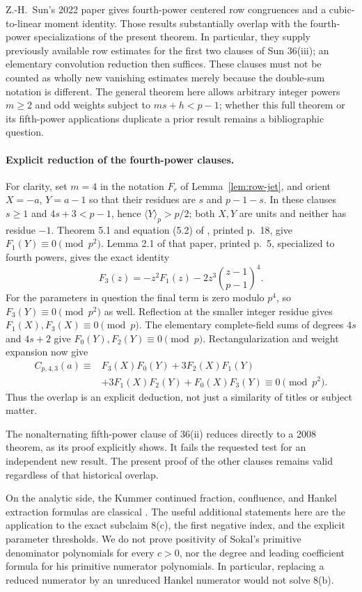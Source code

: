\documentclass[11pt,a4paper]{article}
\theoremstyle{remark}
\begin{document}
Z.-H.~Sun's 2022 paper \cite{zhsun2022} gives fourth-power centered
row congruences and a cubic-to-linear moment identity. Those results
substantially overlap with the fourth-power specializations of the
present theorem. In particular, they supply previously available row
estimates for the first two clauses of Sun 36(iii); an elementary
convolution reduction then suffices. These clauses must not be counted
as wholly new vanishing estimates merely because the double-sum
notation is different. The general theorem here allows arbitrary
integer powers $m\ge2$ and odd weights subject to $ms+h<p-1$;
whether this full theorem or its fifth-power applications duplicate a
prior result remains a bibliographic question.

\paragraph{Explicit reduction of the fourth-power clauses.}
For clarity, set $m=4$ in the notation $F_r$ of
Lemma~\ref{lem:row-jet}, and orient $X=-a$, $Y=a-1$ so that their
residues are $s$ and $p-1-s$. In these clauses $s\ge1$ and
$4s+3<p-1$, hence $\langle Y\rangle_p>p/2$; both $X,Y$ are units
and neither has residue $-1$. Theorem 5.1 and equation (5.2) of
\cite{zhsun2022}, printed p.~18, give
$F_1(Y)\equiv0\pmod{p^2}$. Lemma 2.1 of that paper, printed p.~5,
specialized to fourth powers, gives the exact identity
\[
 F_3(z)=-z^2F_1(z)-2z^3\binom{z-1}{p-1}^{4}.
\]
For the parameters in question the final term is zero modulo $p^4$,
so $F_3(Y)\equiv0\pmod{p^2}$ as well. Reflection at the smaller
integer residue gives $F_1(X),F_3(X)\equiv0\pmod p$.
The elementary complete-field sums of degrees $4s$ and $4s+2$ give
$F_0(Y),F_2(Y)\equiv0\pmod p$.
Rectangularization and weight expansion now give
\begin{align*}
 C_{p,4,3}(a)\equiv{}&F_3(X)F_0(Y)+3F_2(X)F_1(Y)\\
 &+3F_1(X)F_2(Y)+F_0(X)F_3(Y)\equiv0\pmod{p^2}.
\end{align*}
Thus the overlap is an explicit deduction, not just a similarity of
titles or subject matter.

The nonalternating fifth-power clause of 36(ii) reduces directly to
a 2008 theorem, as its proof explicitly shows. It fails the requested
test for an independent new result. The present proof of the other
clauses remains valid regardless of that historical overlap.

On the analytic side, the Kummer continued fraction, confluence, and
Hankel extraction formulas are classical \cite{dlmf,sokal2023}.
The useful additional statements here are the application to the
exact subclaim 8(c), the first negative index, and the explicit
parameter thresholds. We do not prove positivity of Sokal's primitive
denominator polynomials for every $c>0$, nor the degree and leading
coefficient formula for his primitive numerator polynomials. In
particular, replacing a reduced numerator by an unreduced Hankel
numerator would not solve 8(b).
\end{document}
